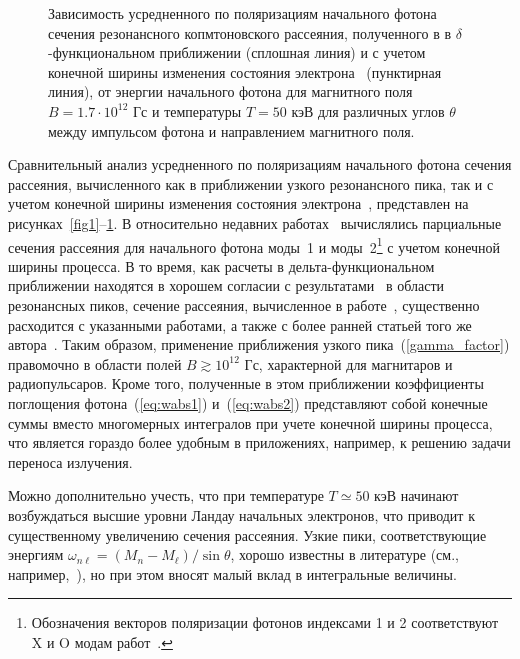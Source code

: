 \documentclass[cp1251%
               ]{jetp} %
\begin{document}
\begin{figure}[t!]
\caption{Зависимость усредненного по поляризациям начального фотона сечения резонансного копмтоновского рассеяния, полученного в в $\delta$-функциональном приближении (сплошная линия) и с учетом конечной ширины изменения состояния электрона~\cite{Harding:1991} (пунктирная линия), от энергии начального фотона для магнитного поля $B = 1.7 \cdot 10^{12}$ Гс и температуры $T=50$ кэВ для различных углов $\theta$ между импульсом фотона и направлением магнитного поля.}
\label{fig4}
\end{figure}

Сравнительный анализ усредненного по поляризациям начального фотона сечения 
рассеяния, вычисленного как в приближении узкого резонансного пика, так и с 
учетом конечной ширины изменения состояния электрона~\cite{Harding:1991,SchwarmD:2017}, представлен на 
рисунках~\ref{fig1}--\ref{fig4}.  
В относительно недавних работах~\cite{Mushtukov:2016,SchwarmD:2017} вычислялись 
парциальные сечения рассеяния для начального фотона моды~1 и моды~2\footnote{Обозначения векторов поляризации фотонов индексами 1 и 2 соответствуют X и O модам работ~\cite{Mushtukov:2016,SchwarmD:2017}.} с учетом 
конечной ширины процесса. В то время, как расчеты в дельта-функциональном 
приближении находятся в хорошем согласии с 
результатами~\cite{Harding:1991,SchwarmD:2017} в области резонансных пиков, 
сечение рассеяния, вычисленное в работе~\cite{Mushtukov:2016}, существенно 
расходится с указанными работами, а также с более ранней статьей того же 
автора~\cite{Mushtukov:2015}. Таким образом, применение 
приближения узкого пика~(\ref{gamma_factor}) правомочно  в области полей $B \gtrsim 10^{12}$ Гс, характерной для магнитаров и радиопульсаров. Кроме того, 
полученные в этом приближении коэффициенты поглощения фотона~(\ref{eq:wabs1}) 
и~(\ref{eq:wabs2}) 
представляют собой конечные суммы вместо многомерных интегралов при учете 
конечной ширины процесса, что является гораздо более 
удобным в приложениях, например, к решению задачи переноса излучения.

Можно дополнительно учесть, что при температуре $T\simeq 50$ кэВ начинают 
возбуждаться высшие уровни Ландау начальных электронов, что приводит к 
существенному увеличению  сечения рассеяния. Узкие пики, соответствующие 
энергиям $\omega_{n\ell}=(M_n-M_\ell)/\sin \theta$, хорошо известны в 
литературе (см., например,~\cite{Pavlov:1991,Klepikov:1954,Baier:2007}), но при этом вносят 
малый вклад в интегральные величины.


\end{document}
